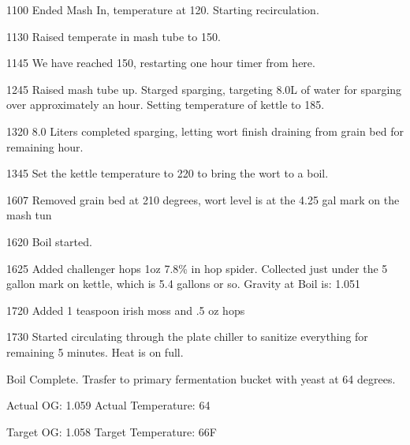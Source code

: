 1100 Ended Mash In, temperature at 120.  Starting recirculation.

1130 Raised temperate in mash tube to 150.  

1145 We have reached 150, restarting one hour timer from here.

1245 Raised mash tube up. Starged sparging, targeting 8.0L of water for sparging over approximately an hour.  Setting temperature of kettle to 185.

1320 8.0 Liters completed sparging, letting wort finish draining from grain bed for remaining hour.

1345 Set the kettle temperature to 220 to bring the wort to a boil.

1607 Removed grain bed at 210 degrees, wort level is at the 4.25 gal mark on the mash tun

1620 Boil started.

1625 Added challenger hops 1oz 7.8\% in hop spider.  Collected just under the 5 gallon mark on kettle, which is 5.4 gallons or so.  Gravity at Boil is: 1.051

1720 Added 1 teaspoon irish moss and .5 oz hops

1730 Started circulating through the plate chiller to sanitize everything for remaining 5 minutes.  Heat is on full.

Boil Complete.  Trasfer to primary fermentation bucket with yeast at 64 degrees.

Actual OG: 1.059
Actual Temperature: 64

Target OG: 1.058
Target Temperature: 66F
